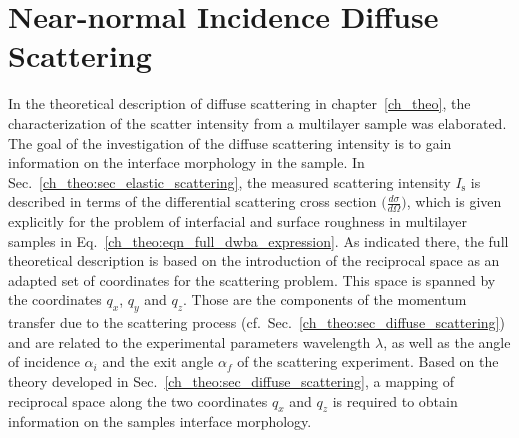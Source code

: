 \section{Near-normal Incidence Diffuse Scattering} \label{ch_diff:sec_PTB17}
In the theoretical description of diffuse scattering in chapter~\ref{ch_theo}, the characterization of the scatter intensity from a multilayer sample was elaborated. The goal of the investigation of the diffuse scattering intensity is to gain information on the interface morphology in the sample. In Sec.~\ref{ch_theo:sec_elastic_scattering}, the measured scattering intensity $I_\text{s}$ is described in terms of the differential scattering cross section $\big(\frac{d \sigma}{d \Omega}\big)$, which is given explicitly for the problem of interfacial and surface roughness in multilayer samples in Eq.~\eqref{ch_theo:eqn_full_dwba_expression}. As indicated there, the full theoretical description is based on the introduction of the reciprocal space as an adapted set of coordinates for the scattering problem. This space is spanned by the coordinates $q_x$, $q_y$ and $q_z$. Those are the components of the momentum transfer due to the scattering process (cf.~Sec.~\ref{ch_theo:sec_diffuse_scattering}) and are related to the experimental parameters wavelength $\lambda$, as well as the angle of incidence $\alpha_i$ and the exit angle $\alpha_f$ of the scattering experiment. Based on the theory developed in Sec.~\ref{ch_theo:sec_diffuse_scattering}, a mapping of reciprocal space along the two coordinates $q_x$ and $q_z$ is required to obtain information on the samples interface morphology.

